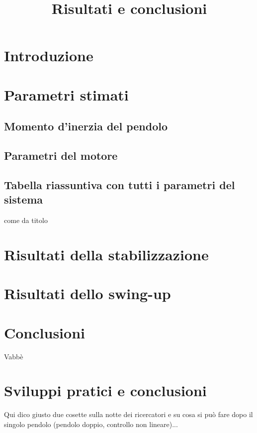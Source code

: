 \title{Risultati e conclusioni}
\maketitle
\label{sec:conclusions}

\section{Introduzione}

\section{Parametri stimati}
\subsection{Momento d'inerzia del pendolo}

\subsection{Parametri del motore}

\subsection{Tabella riassuntiva con tutti i parametri del sistema}
come da titolo

\section{Risultati della stabilizzazione}


\section{Risultati dello swing-up}


\section{Conclusioni}
Vabbè

\section{Sviluppi pratici e conclusioni}
Qui dico giusto due cosette sulla notte dei ricercatori e su
cosa si può fare dopo il singolo pendolo (pendolo doppio, controllo non lineare)...
